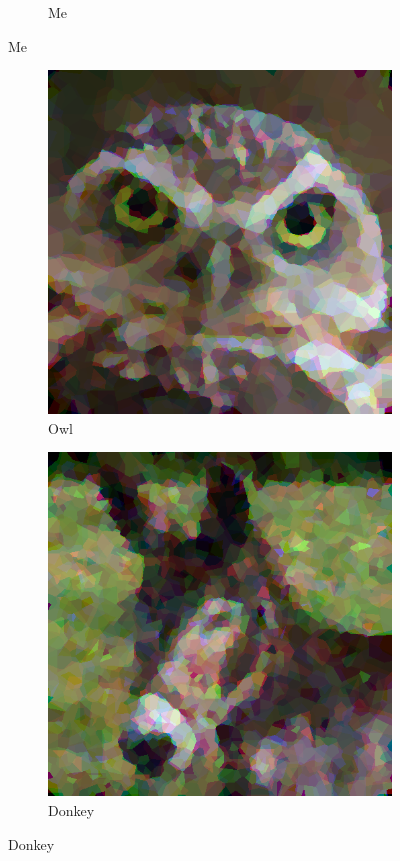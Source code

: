 \documentclass{article}
\begin{document}
\begin{figure}[ht]
\begin{subfigure}[b]{0.45\textwidth}
         \caption{Me}
     \end{subfigure}
\end{figure}

\begin{figure}[ht]
   	 \centering
     \begin{subfigure}[b]{0.45\textwidth}
         \centering
         \includegraphics[width=\textwidth]{latex_src/voronoi21.png}
         \caption{Owl}
     \end{subfigure}
     \hfill
     \begin{subfigure}[b]{0.45\textwidth}
         \centering
         \includegraphics[width=\textwidth]{latex_src/voronoi22.png}
         \caption{Donkey}
     \end{subfigure}
\end{figure}
\end{document}
